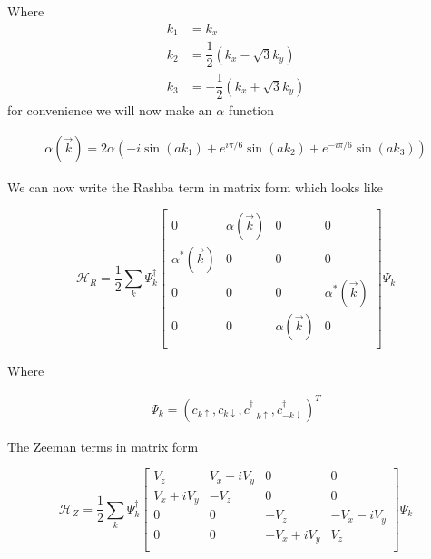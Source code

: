 Where
\begin{align}
  k_1 &= k_x \\
  k_2 &= \dfrac{1}{2}(k_x - \sqrt{3} k_y) \\
  k_3 &= -\dfrac{1}{2}(k_x + \sqrt{3} k_y)
\end{align}
for convenience we will now make an $\alpha$ function

\begin{align}
  \alpha(\vec{k}) = 2\alpha(-i\sin(ak_1) + e^{i\pi/6}\sin(ak_2) + e^{-i\pi/6}\sin(ak_3))
\end{align}

We can now write the Rashba term in matrix form which looks like

\[
  \mathcal{H}_R = \dfrac{1}{2} \sum\limits_k\Psi^{\dagger}_k 
  \begin{bmatrix}
    0 & \alpha(\vec{k})   & 0 & 0 \\
    \alpha^*(\vec{k}) & 0 & 0 & 0 \\
    0 & 0 & 0 & \alpha^*(\vec{k}) \\
    0 & 0 & \alpha(\vec{k})   & 0 \\
  \end{bmatrix}
  \Psi_k 
\]

Where 

\begin{align}
  \Psi_k = (c_{k\uparrow}, c_{k\downarrow}, c^{\dagger}_{-k\uparrow}, c^{\dagger}_{-k\downarrow})^T
\end{align}

The Zeeman terms in matrix form

\[
  \mathcal{H}_Z = \dfrac{1}{2} \sum\limits_k\Psi^{\dagger}_k 
  \begin{bmatrix}
    V_z & V_x-iV_y  & 0 & 0 \\
    V_x+iV_y & -V_z & 0 & 0 \\
    0 & 0 & -V_z & -V_x-iV_y\\
    0 & 0 & -V_x+iV_y & V_z \\
  \end{bmatrix}
  \Psi_k 
\]

